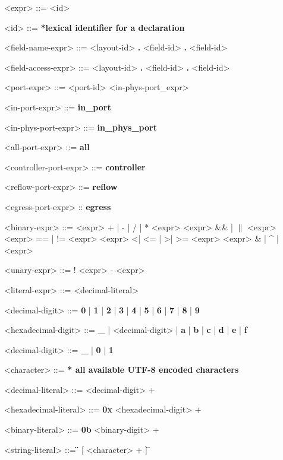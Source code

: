 
\begin{mdframed}
\begin{grammar}

<expr> ::=
<id>

<id> ::= \textbf{*lexical identifier for a declaration}

<field-name-expr> ::=
<layout-id> \textbf{.} <field-id>
 \textbf{.} <field-id>

<field-access-expr> ::=
<layout-id> \textbf{.} <field-id>
 \textbf{.} <field-id>

<port-expr> ::=
<port-id>
\alt <in-phys-port_expr>

<in-port-expr> ::= \textbf{in\_port}

<in-phys-port-expr> ::=  \textbf{in\_phys\_port}

<all-port-expr> ::= \textbf{all}

<controller-port-expr> ::= \textbf{controller}

<reflow-port-expr> ::= \textbf{reflow}

<egress-port-expr> :: \textbf{egress}

<binary-expr> ::= <expr>  + | - | / | *  <expr>
\alt <expr>  \&\& | $\|$  <expr>
\alt <expr> == | != <expr>
\alt <expr>  \textless | \textless= | \textgreater | \textgreater=  <expr>
\alt <expr>  \& | \string^ | \textbar  <expr>

<unary-expr> ::= 
! <expr>
\alt - <expr>

<literal-expr> ::=
<decimal-literal>

<decimal-digit> ::= \textbf{0} | \textbf{1} | \textbf{2} | \textbf{3} | \textbf{4} | \textbf{5} | \textbf{6} | \textbf{7} | \textbf{8} | \textbf{9}

<hexadecimal-digit> ::= \textbf{\_} | <decimal-digit> | \textbf{a} | \textbf{b} | \textbf{c} | \textbf{d} | \textbf{e} | \textbf{f}             

<decimal-digit> ::= \textbf{\_} | \textbf{0} | \textbf{1}

<character> ::= \textbf{* all available UTF-8 encoded characters}

<decimal-literal> ::=
<decimal-digit> +

<hexadecimal-literal> ::=
\textbf{0x} <hexadecimal-digit> +

<binary-literal> ::=
\textbf{0b} <binary-digit> +

<string-literal> ::=
\textbf{\"} [ <character> + ] \textbf{\"} 

\end{grammar}
\end{mdframed}

